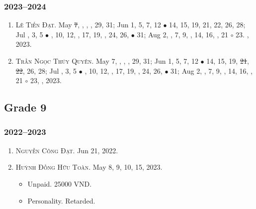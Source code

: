 \documentclass{article}
\begin{document}
\subsubsection{2023--2024}

\begin{enumerate}
	\item \textsc{Lê Tiến Đạt.} May \st{7}, , , , 29, 31; Jun 1, 5, 7, 12 $\bullet$ 14, 15, 19, 21, 22, 26, 28; Jul , 3, 5 $\bullet$ , 10, 12, , 17, 19, , 24, 26,  $\bullet$ 31; Aug 2, , 7, 9, , 14, 16, , 21 $\circ$ 23. , 2023.
	\item \textsc{Trần Ngọc Thúy Quyên.} May 7, , , , 29, 31; Jun 1, 5, 7, 12 $\bullet$ 14, 15, 19, \st{21}, \st{22}, 26, 28; Jul , 3, 5 $\bullet$ , 10, 12, , 17, 19, , 24, 26,  $\bullet$ 31; Aug 2, , 7, 9, , 14, 16, , 21 $\circ$ 23, , 2023.
\end{enumerate}


\subsection{Grade 9}

\subsubsection{2022--2023}

\begin{enumerate}
	\item \textsc{Nguyễn Công Đạt.} {\sf[In]} Jun 21, 2022. {\sf[Out]}
	\item \textsc{Huỳnh Đồng Hữu Toàn.} {\sf[In]} May 8, 9, 10, 15, 2023. {\sf[Out]}
	\begin{itemize}
		\item {\sf Unpaid.} 25000 VND.
		\item {\sf Personality.} Retarded.
	\end{itemize}
\end{enumerate}
\end{document}
